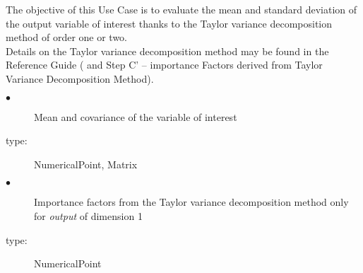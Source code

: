 \renewcommand{\filename}{docUC_CentralUncertainty_TaylorVarDecomposition.tex}
\renewcommand{\filetitle}{UC : Moments evaluation from the Taylor variance decomposition method and evaluation of the importance factors associated}

\HeaderIIILevel



The objective of this Use Case  is to evaluate the mean and standard deviation of the output variable of interest thanks to the Taylor variance decomposition method of order one or two.\\

Details on the  Taylor variance decomposition method may be found in the Reference Guide ( and Step C' -- importance Factors derived from Taylor Variance Decomposition Method).\\




             {
               \begin{description}
               \item[$\bullet$] Mean and covariance of the variable of interest
               \item[type:] NumericalPoint, Matrix
               \item[$\bullet$] Importance factors from the Taylor variance decomposition method only for {\itshape output} of dimension 1
               \item[type:] NumericalPoint
               \end{description}
             }

